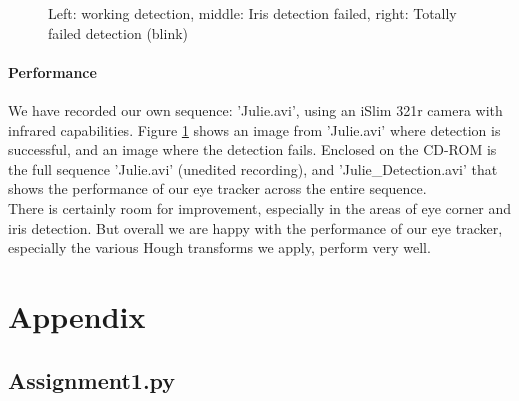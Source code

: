 \documentclass[a4paper,11pt]{article}
\begin{document}
\begin{figure}[ht]
  \caption{Left: working detection, middle: Iris detection failed, right: Totally failed detection (blink)}
  \label{fig:results}
\end{figure}

\paragraph{Performance}
We have recorded our own sequence: 'Julie.avi', using an iSlim 321r camera with infrared capabilities. Figure \ref{fig:results} shows an image from 'Julie.avi' where detection is successful, and an image where the detection fails. Enclosed on the CD-ROM is the full sequence 'Julie.avi' (unedited recording), and 'Julie\_Detection.avi' that shows the performance of our eye tracker across the entire sequence. \\

There is certainly room for improvement, especially in the areas of eye corner and iris detection. But overall we are happy with the performance of our eye tracker, especially the various Hough transforms we apply, perform very well. 
\newpage

\section*{Appendix}
\subsection{Assignment1.py}

\end{document}

